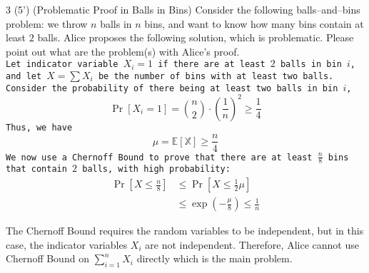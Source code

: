 \begin{question}{3 (5') (Problematic Proof in Balls in Bins)} Consider the following balls--and--bins problem: we throw $n$ balls in $n$ bins, and want to know how many bins contain at least $2$ balls. Alice proposes the following solution, which is problematic. Please point out what are the problem(s) with Alice's proof.\\

\texttt{Let indicator variable $X_i = 1$ if there are at least $2$ balls in bin $i$, and let $X = \sum X_i$ be the number of bins with at least two balls. Consider the probability of there being at least two balls in bin $i$,}
$$ \Pr[X_i = 1] = \binom{n}{2}\cdot \left(\frac{1}{n}\right)^2 \geq \frac{1}{4}$$
\texttt{Thus, we have}
$$ \mu = \mathbb{E[X]} \geq \frac{n}{4}$$
\texttt{We now use a Chernoff Bound to prove that there are at least $\frac{n}{8}$ bins that contain $2$ balls, with high probability:}
\begin{align*}
    \Pr[X\leq \frac{n}{8}] & \leq \Pr[X \leq \frac{1}{2}\mu] \\
    & \leq \exp\left(- \frac{\mu}{8}\right) \leq \frac{1}{n}
\end{align*}
\end{question}

\begin{answer}
    The Chernoff Bound requires the random variables to be independent, but in this case, the indicator variables $X_i$ are not independent. Therefore,  Alice cannot use Chernoff Bound on $\sum_{i=1}^n X_i$ directly which is the main problem.
    \ed
\end{answer}
